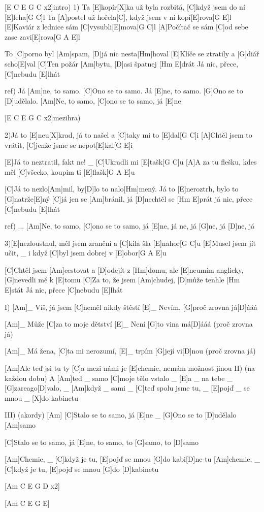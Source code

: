 
[E C E G C x2]intro)
1) Ta [E]kopír[X]ka už byla rozbitá,
[C]když jsem do ní [E]leha[G C]l
Ta [A]postel už hořela[C], 
když jsem v ní kopí[E]rova[G E]l
[E]Kaviár z lednice sám
[C]vysubli[E]mova[G C]l
[A]Počítač se sám [C]od sebe
zase zavi[E]rova[G A E]l

To [C]porno byl [Am]spam, [D]já nic nesta[Hm]hoval
[E]Klíče se ztratily a [G]diář scho[E]val
[C]Ten požár [Am]bytu, [D]asi špatnej [Hm E]drát
Já nic, přece, [C]nebudu [E]lhát

ref)
Já [Am]ne, to samo. [C]Ono se to samo.
Já [E]ne, to samo. [G]Ono se to [D]udělalo.
[Am]Ne, to samo, [C]ono se to samo, já [E]ne

[E C E G C x2]mezihra)

2)Já to [E]neu[X]krad, já to našel
a [C]taky mi to [E]dal[G C]i
[A]Chtěl jsem to vrátit,
[C]jenže jsme se nepot[E]kal[G E]i

[E]Já to neztratil, fakt ne! \_
[C]Ukradli mi [E]tašk[G C]u
[A]A za tu flešku, kdes měl [C]všecko,
koupim ti [E]flašk[G A E]u 

[C]Já to nezlo[Am]mil, by[D]lo to nalo[Hm]mený. Já to
[E]neroztrh, bylo to [G]natrže[E]ný
[C]já jen se [Am]bránil, já [D]nechtěl se [Hm E]prát
já nic, přece [C]nebudu [E]lhát

ref)
...
[Am]Ne, to samo, [C]ono se to samo, já [E]ne,
já ne, já [G]ne, já [D]ne, já

3)[E]nezloustnul, měl jsem zranění
a [C]kila šla [E]nahor[G C]u
[E]Musel jsem jít učit, \_
i když [C]byl jsem dobrej v [E]obor[G A E]u 

[C]Chtěl jsem [Am]cestovat a [D]odejít z [Hm]domu,
ale [E]neumím anglicky, [G]nevedli mě k [E]tomu
[C]Za to, že jsem [Am]chudej, [D]může tenhle [Hm E]stát
Já nic, přece [C]nebudu [E]lhát

I)
[Am]\_ Víš, já jsem [C]neměl nikdy štěstí
[E]\_ Nevím, [G]proč zrovna já[D]\null ááá

[Am]\_ Může [C]za to moje dětství
[E]\_ Není [G]to vina má[D]\null ááá (proč zrovna já)

[Am]\_ Má žena, [C]ta mi nerozumí,
[E]\_ trpím [G]její vi[D]nou (proč zrovna já)

[Am]Ale teď jsi tu ty [C]a mezi námi
je [E]chemie, nemám možnost jinou
\slpc
II) (na každou dobu)
A [Am]teď \_ samo [C]moje tělo vstalo \_
[E]a \_ na tebe \_ [G]zareago[D]valo, \_
[Am]když \_ sami \_ [C]teď spolu jsme tu, \_
[E]pojď \_ se mnou \_ [X]do kabinetu

III) (akordy)
[Am]
[C]Stalo se to samo, já [E]ne \_
[G]Ono se to [D]udělalo [Am]samo

[C]Stalo se to samo, já [E]ne, to samo,
to [G]samo, to [D]samo

[Am]Chemie, \_
[C]když je tu, [E]pojď se mnou
[G]do kabi[D]ne-tu
[Am]chemie, \_
[C]když je tu, [E]pojď se mnou
[G]do [D]kabinetu

[Am C E G D x2]

[Am C E G E]




